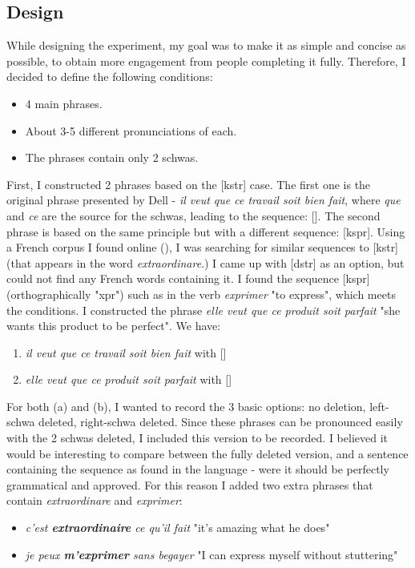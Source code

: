\documentclass{article}
\begin{document}
\subsection{Design}
While designing the experiment, my goal was to make it as simple and concise as possible, to obtain more engagement from people completing it fully. Therefore, I decided to define the following conditions:
\begin{itemize}
  \item 4 main phrases.
  \item About 3-5 different pronunciations of each.
  \item The phrases contain only 2 schwas.
\end{itemize}
First,  I constructed 2 phrases based on the [kstr] case. The first one is the original phrase presented by Dell - \textit{il veut que ce travail soit bien fait}, where \textit{que} and \textit{ce} are the source for the schwas, leading to the sequence: [].
The second phrase is based on the same principle but with a different sequence: [kspr]. Using a French corpus I found online (\cite{corpus}), I was searching for similar sequences to [kstr] (that appears in the word \textit{extraordinare}.) I came up with [dstr] as an option, but could not find any French words containing it. I found the sequence [kspr] (orthographically "xpr") such as in the verb \textit{exprimer} "to express", which meets the conditions. I constructed the phrase \textit{elle veut que ce produit soit parfait} "she wants this product to be perfect". We have:
\begin{enumerate} [label=(\alph*)]
  \item \textit{il veut que ce travail soit bien fait} with []
  \item \textit{elle veut que ce produit soit parfait} with []
\end{enumerate}
For both (a) and (b), I wanted to record the 3 basic options: no deletion, left-schwa deleted, right-schwa deleted. Since these phrases can be pronounced easily with the 2 schwas deleted,  I included this version to be recorded. I believed it would be interesting to compare between the fully deleted version, and a sentence containing the sequence as found in the language - were it should be perfectly grammatical and approved.  For this reason I added two extra phrases that contain \textit{extraordinare} and \textit{exprimer}:
\begin{itemize}
  \item \textit{c’est \textbf{extraordinaire} ce qu’il fait} "it's amazing what he does"
  \item \textit{je peux \textbf{m’exprimer} sans begayer} "I can express myself without stuttering"
\end{itemize}
\end{document}
